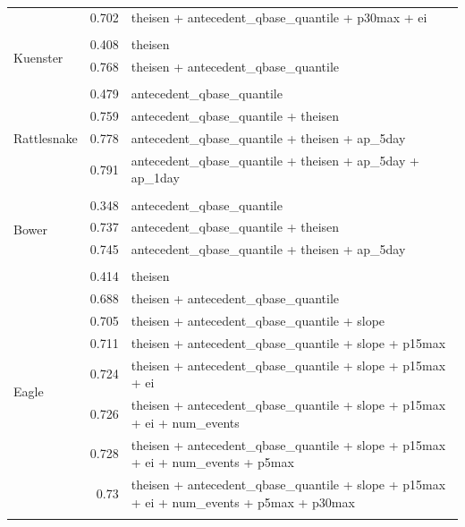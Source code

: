 \documentclass[10pt]{article}
\begin{document}
\begin{table}[h]
\begin{center}
\begin{tabular}{lrl}
 & 0.702 & theisen + antecedent\_qbase\_quantile + p30max + ei\\ 
\vspace{2mm}\\ \multirow{3}{*}{Kuenster} & 0.408 & theisen\\ 
 & 0.768 & theisen + antecedent\_qbase\_quantile\\ 
\vspace{2mm}\\ \multirow{5}{*}{Rattlesnake} & 0.479 & antecedent\_qbase\_quantile\\ 
 & 0.759 & antecedent\_qbase\_quantile + theisen\\ 
 & 0.778 & antecedent\_qbase\_quantile + theisen + ap\_5day\\ 
 & 0.791 & antecedent\_qbase\_quantile + theisen + ap\_5day + ap\_1day\\ 
\vspace{2mm}\\ \multirow{4}{*}{Bower} & 0.348 & antecedent\_qbase\_quantile\\ 
 & 0.737 & antecedent\_qbase\_quantile + theisen\\ 
 & 0.745 & antecedent\_qbase\_quantile + theisen + ap\_5day\\ 
\vspace{2mm}\\ \multirow{9}{*}{Eagle} & 0.414 & theisen\\ 
 & 0.688 & theisen + antecedent\_qbase\_quantile\\ 
 & 0.705 & theisen + antecedent\_qbase\_quantile + slope\\ 
 & 0.711 & theisen + antecedent\_qbase\_quantile + slope + p15max\\ 
 & 0.724 & theisen + antecedent\_qbase\_quantile + slope + p15max + ei\\ 
 & 0.726 & theisen + antecedent\_qbase\_quantile + slope + p15max + ei + num\_events\\ 
 & 0.728 & theisen + antecedent\_qbase\_quantile + slope + p15max + ei + num\_events + p5max\\ 
 & 0.73 & theisen + antecedent\_qbase\_quantile + slope + p15max + ei + num\_events + p5max + p30max\\ 
\vspace{2mm}\\     \end{tabular}
    \caption{\label{sed_r_square_nosnow}}
    \end{center}
\end{table}
\end{document}
